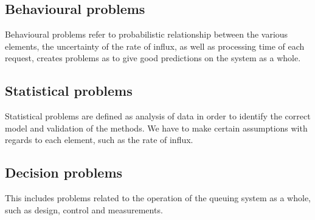 \documentclass[../main.tex]{subfiles}
\begin{document}
\subsection*{Behavioural problems}
Behavioural problems refer to probabilistic relationship between the various elements, the uncertainty of the rate of influx, as well as processing time of each request, creates problems as to give good predictions on the system as a whole. \cite{simple_markovian_queuing}
\subsection*{Statistical problems}
Statistical problems are defined as analysis of data in order to identify the correct model and validation of the methods. \cite{simple_markovian_queuing} We have to make certain assumptions with regards to each element, such as the rate of influx.
\subsection*{Decision problems}
This includes problems related to the operation of the queuing system as a whole, such as design, control and measurements. \cite{simple_markovian_queuing}
\end{document}
